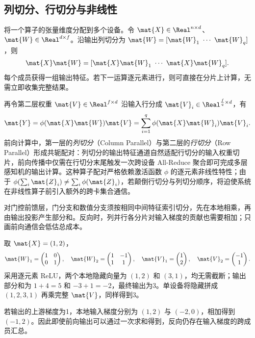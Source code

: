\documentclass[../textbook.tex]{subfiles}
\begin{document}
\subsection{列切分、行切分与非线性}
将一个算子的张量维度分配到多个设备。令 $\mat{X}\in\Real^{n\times d}$、$\mat{W}\in\Real^{d\times f}$。沿输出列切分为 $\mat{W}=[\mat{W}_1\ \cdots\ \mat{W}_q]$，则
\begin{equation}
 \mat{X}\mat{W}=[\mat{X}\mat{W}_1\ \cdots\ \mat{X}\mat{W}_q].
 \label{eq:dist-column}
\end{equation}
每个成员获得一组输出特征。若下一运算逐元素进行，则可直接在分片上计算，无需立即收集完整结果。

再令第二层权重 $\mat{V}\in\Real^{f\times d}$ 沿输入行分成 $\mat{V}_i\in\Real^{\frac{f}{q}\times d}$，有
\begin{equation}
 \mat{Y}=\phi(\mat{X}\mat{W})\mat{V}=\sum_{i=1}^q\phi(\mat{X}\mat{W}_i)\mat{V}_i.
 \label{eq:dist-paired-mlp}
\end{equation}
前向计算中，第一层的\emph{列切分}（Column Parallel）与第二层的\emph{行切分}（Row Parallel）形成共轭配对：列切分的输出特征通道自然适配行切分的输入权重切片，前向传播中仅需在行切分末尾触发一次跨设备 All-Reduce 聚合即可完成多层感知机的输出计算\autocite{shoeybi2020megatron}。这种算子配对严格依赖激活函数 $\phi$ 的逐元素非线性特性；由于 $\phi(\sum_i \mat{Z}_i)\ne \sum_i \phi(\mat{Z}_i)$，若颠倒行切分与列切分顺序，将迫使系统在非线性算子前引入额外的跨卡集合通信。

对门控前馈层，门分支和数值分支须按相同中间特征索引切分，先在本地相乘，再由输出投影产生部分和。反向时，列并行各分片对输入梯度的贡献也需要相加；只画前向通信会低估总成本。

\begin{example}
取 $\mat{X}=(1,2)$，
\begin{equation*}
 \mat{W}_1=\begin{pmatrix}1&0\\0&1\end{pmatrix},\quad
 \mat{W}_2=\begin{pmatrix}1&-1\\1&1\end{pmatrix},\quad
 \mat{V}_1=\begin{pmatrix}1\\2\end{pmatrix},\quad
 \mat{V}_2=\begin{pmatrix}-1\\1\end{pmatrix}.
\end{equation*}
采用逐元素 ReLU，两个本地隐藏向量为 $(1,2)$ 和 $(3,1)$，均无需截断；输出部分和为 $1+4=5$ 和 $-3+1=-2$，最终输出为3。单设备将隐藏拼成 $(1,2,3,1)$ 再乘完整 $\mat{V}$，同样得到3。

若输出的上游梯度为1，本地输入梯度分别为 $(1,2)$ 与 $(-2,0)$，相加得到 $(-1,2)$。因此即使前向输出可以通过一次求和得到，反向仍存在输入梯度的跨成员汇总。
\end{example}
\end{document}
